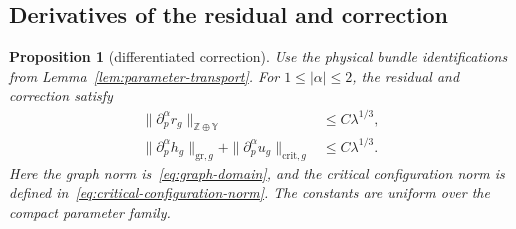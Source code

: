 \documentclass[11pt]{amsart}
\newtheorem{proposition}[theorem]{Proposition}
\theoremstyle{definition}
\theoremstyle{remark}
\theoremstyle{plain}
\begin{document}
\subsection{Derivatives of the residual and correction}
\begin{proposition}[differentiated correction]
\label{prop:correction-derivatives}
Use the physical bundle identifications from
Lemma~\ref{lem:parameter-transport}.  For $1\leq|\alpha|\leq2$, the
residual and correction satisfy
\begin{align}\label{eq:residual-parameter-derivatives}
 \|\partial_p^\alpha r_g\|_{\mathbb Z\oplus\mathbb Y}
 &\leq C\lambda^{1/3},\\
 \|\partial_p^\alpha h_g\|_{\mathrm{gr},g}
 +\|\partial_p^\alpha u_g\|_{\mathrm{crit},g}
 &\leq C\lambda^{1/3}.
 \label{eq:correction-parameter-derivatives}
\end{align}
Here the graph norm is~\eqref{eq:graph-domain}, and the critical
configuration norm is defined in~\eqref{eq:critical-configuration-norm}.
The constants are uniform over the compact parameter family.
\end{proposition}
\end{document}
